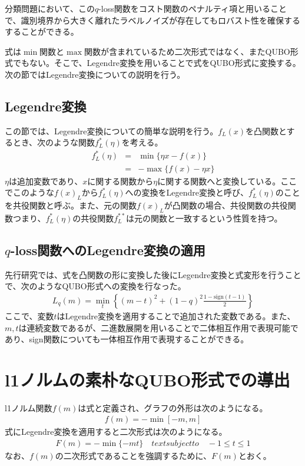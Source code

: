 \documentclass[paper]{ieicej}
\begin{document}
分類問題において、この$q$-loss関数をコスト関数のペナルティ項と用いることで、識別境界から大きく離れたラベルノイズが存在してもロバスト性を確保するすることができる。

式は$\min$関数と$\max$関数が含まれているため二次形式ではなく、またQUBO形式でもない。そこで、Legendre変換を用いることで式をQUBO形式に変換する。次の節ではLegendre変換についての説明を行う。

\subsection{Legendre変換}
この節では、Legendre変換についての簡単な説明を行う。$f_{L}(x)$を凸関数とするとき、次のような関数$f^{*}_{L}(\eta)$を考える。
\begin{eqnarray}
 f^{*}_{L}(\eta) &=& \min{\{\eta x-f(x)\}} \\
                 &=& -\max{\{f(x)-\eta x\}}
\end{eqnarray}
$\eta$は追加変数であり、$x$に関する関数から$\eta$に関する関数へと変換している。ここでこのような$f(x)_{L}$から$f^{*}_{L}(\eta)$への変換をLegendre変換と呼び、$f^{*}_{L}(\eta)$のことを共役関数と呼ぶ。また、元の関数$f(x)_{L}$が凸関数の場合、共役関数の共役関数つまり、$f^{*}_{L}(\eta)$の共役関数$f^{**}_{L}$は元の関数と一致するという性質を持つ。

\subsection{$q$-loss関数へのLegendre変換の適用}
先行研究では、式を凸関数の形に変換した後にLegendre変換と式変形を行うことで、次のようなQUBO形式への変換を行なった。
\begin{eqnarray}
 L_{q}(m) = \min_{t}{\left\{(m-t)^{2}+(1-q)^{2}\frac{1-\mathrm{sign}(t-1)}{2}\right\}}
\end{eqnarray}
ここで、変数$t$はLegendre変換を適用することで追加された変数である。また、$m,t$は連続変数であるが、二進数展開を用いることで二体相互作用で表現可能であり、sign関数についても一体相互作用で表現することができる。

\section{l1ノルムの素朴なQUBO形式での導出}
l1ノルム関数$f(m)$は式と定義され、グラフの外形は次のようになる。
\begin{eqnarray}
 f(m) = -\min{[-m,m]}
\end{eqnarray}
式にLegendre変換を適用すると二次形式は次のようになる。
\begin{eqnarray}
 F(m) = -\min{\{-mt\}} \quad text{subject to} \quad -1\leq t\leq 1
\end{eqnarray}
なお、$f(m)$の二次形式であることを強調するために、$F(m)$とおく。
\end{document}
